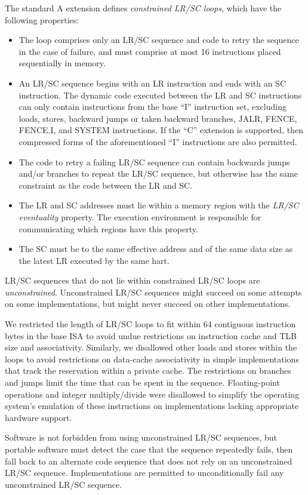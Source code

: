 The standard A extension defines {\em constrained LR/SC loops}, which have
the following properties:
\vspace{-0.2in}
\begin{itemize}
\parskip 0pt
\itemsep 1pt
\item The loop comprises only an LR/SC sequence and code to retry the sequence
  in the case of failure, and must comprise at most 16 instructions placed
  sequentially in memory.
\item An LR/SC sequence begins with an LR instruction and ends with an SC
  instruction.  The dynamic code executed between the LR and SC instructions
  can only contain instructions from the base ``I'' instruction set, excluding
  loads, stores, backward jumps or taken backward branches, JALR, FENCE,
  FENCE.I, and SYSTEM instructions.
  If the ``C'' extension is supported, then compressed
  forms of the aforementioned ``I'' instructions are also permitted.
\item The code to retry a failing LR/SC sequence can contain backwards jumps
  and/or branches to repeat the LR/SC sequence, but otherwise has the same
  constraint as the code between the LR and SC.
\item The LR and SC addresses must lie within a memory region with the
  {\em LR/SC eventuality} property.  The execution environment is responsible
  for communicating which regions have this property.
\item The SC must be to the same effective address and of the same data size as
  the latest LR executed by the same hart.
\end{itemize}

LR/SC sequences that do not lie within constrained LR/SC loops are {\em
unconstrained}.  Unconstrained LR/SC sequences might succeed on some attempts
on some implementations, but might never succeed on other implementations.

\begin{commentary}
We restricted the length of LR/SC loops to fit within 64 contiguous
instruction bytes in the base ISA to avoid undue restrictions on instruction
cache and TLB size and associativity.
Similarly, we disallowed other loads and stores within the loops to avoid
restrictions on data-cache associativity in simple implementations that track
the reservation within a private cache.
The restrictions on branches and jumps limit the time that
can be spent in the sequence.  Floating-point operations and integer
multiply/divide were disallowed to simplify the operating system's emulation
of these instructions on implementations lacking appropriate hardware support.

Software is not forbidden from using unconstrained LR/SC sequences, but
portable software must detect the case that the sequence repeatedly fails,
then fall back to an alternate code sequence that does not rely on an
unconstrained LR/SC sequence.  Implementations are permitted to
unconditionally fail any unconstrained LR/SC sequence.
\end{commentary}

